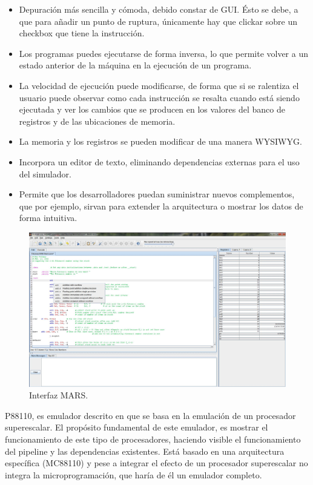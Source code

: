 \begin{itemize}

\item Depuración más sencilla y cómoda, debido constar de GUI. Ésto se debe, a que para añadir un punto de ruptura, únicamente hay que clickar sobre un checkbox que tiene la instrucción.

\item Los programas puedes ejecutarse de forma inversa, lo que permite volver a un estado anterior de la máquina en la ejecución de un programa.

\item La velocidad de ejecución puede modificarse, de forma que si se ralentiza el usuario puede observar como cada instrucción se resalta cuando está siendo ejecutada y ver los cambios que se producen en los valores del banco de registros y de las ubicaciones de memoria.

\item  La memoria y los registros se pueden modificar de una manera WYSIWYG.

\item Incorpora un editor de texto, eliminando dependencias externas para el uso del simulador.

\item Permite que los desarrolladores puedan suministrar nuevos complementos, que por ejemplo, sirvan para extender la arquitectura o mostrar los datos de forma intuitiva.

\end{itemize}

\begin{figure}[htbp]
 	\centering
 	\includegraphics[width=12cm]{figures/mars_figure}
 	\caption{Interfaz MARS.}
	\label{fig:mars_figure}
\end{figure}

P88110, es emulador descrito en \cite{garcia2009p88110} que se basa en la emulación de un procesador superescalar. El propósito fundamental de este emulador, es mostrar el funcionamiento de este tipo de procesadores, haciendo visible el funcionamiento del pipeline y las dependencias existentes. Está basado en una arquitectura específica (MC88110) y pese a integrar el efecto de un procesador superescalar no integra la microprogramación, que haría de él un emulador completo.

